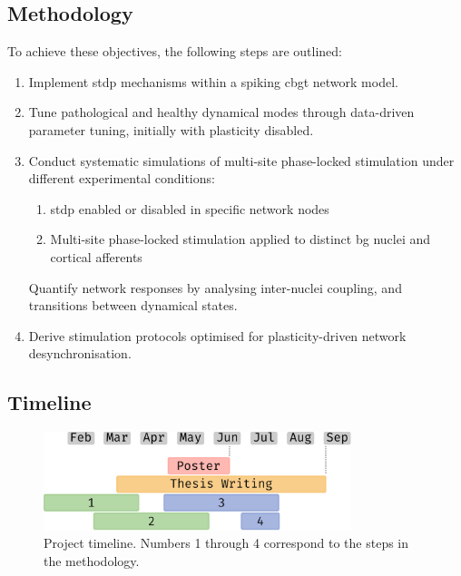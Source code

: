 \subsection{Methodology}
To achieve these objectives, the following steps are outlined:
\begin{enumerate}[nosep]
	\item Implement \acrshort{stdp} mechanisms within a spiking \acrshort{cbgt} network model.
	\item Tune pathological and healthy dynamical modes through data-driven parameter tuning, initially with plasticity disabled.
	\item Conduct systematic simulations of multi-site phase-locked stimulation under different experimental conditions:
	      \begin{enumerate}[nosep, label=\alph*.]
		      \item \acrshort{stdp} enabled or disabled in specific network nodes
		      \item Multi-site phase-locked stimulation applied to distinct \acrshort{bg} nuclei and cortical afferents
	      \end{enumerate}
	      Quantify network responses by analysing inter-nuclei coupling, and transitions between dynamical states.
	\item Derive stimulation protocols optimised for plasticity-driven network desynchronisation.
\end{enumerate}

\subsection{Timeline}
\begin{figure}[ht]
	\centering
	\includegraphics[width=0.8\textwidth]{figs/gant_chart.pdf}
	\caption{Project timeline. Numbers 1 through 4 correspond to the steps in the methodology.}
\end{figure}


\newpage


\newpage

